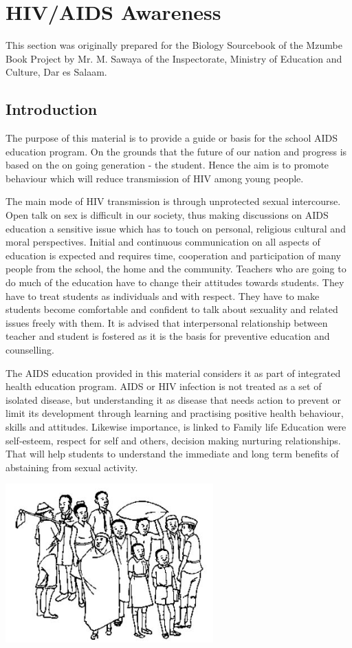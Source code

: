 \chapter{HIV/AIDS Awareness}

This section was originally prepared for the Biology Sourcebook of the Mzumbe Book Project by Mr. M. Sawaya of the Inspectorate, Ministry of Education and Culture, Dar es Salaam.

\section{Introduction}

The purpose of this material is to provide a guide or basis for the school AIDS education
program. On the grounds that the future of our nation and progress is based on the on going
generation - the student. Hence the aim is to promote behaviour which will reduce
transmission of HIV among young people.

The main mode of HIV transmission is through unprotected sexual intercourse. Open talk on
sex is difficult in our society, thus making discussions on AIDS education a sensitive issue
which has to touch on personal, religious cultural and moral perspectives. Initial and
continuous communication on all aspects of education is expected and requires time,
cooperation and participation of many people from the school, the home and the community.
Teachers who are going to do much of the education have to change their attitudes towards
students. They have to treat students as individuals and with respect. They have to make
students become comfortable and confident to talk about sexuality and related issues freely
with them. It is advised that interpersonal relationship between teacher and student is
fostered as it is the basis for preventive education and counselling.

The AIDS education provided in this material considers it as part of integrated health
education program. AIDS or HIV infection is not treated as a set of isolated disease, but
understanding it as disease that needs action to prevent or limit its development through
learning and practising positive health behaviour, skills and attitudes. Likewise importance, is
linked to Family life Education were self-esteem, respect for self and others, decision making
nurturing relationships. That will help students to understand the immediate and long term
benefits of abstaining from sexual activity.

\begin{center}
\includegraphics[width=0.6\textwidth]{./img/source/aids-1.jpg}
\end{center}

